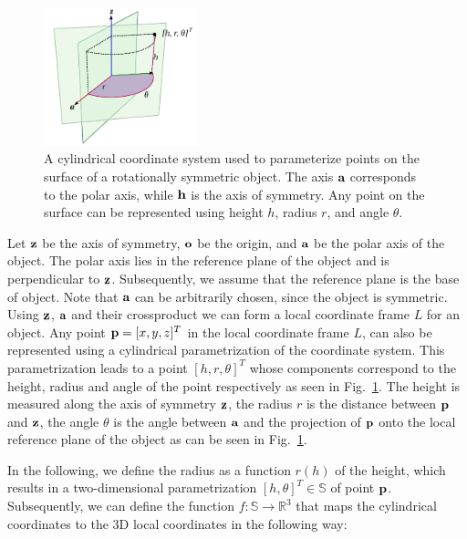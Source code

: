 \documentclass{aamas2015}
\begin{document}
\begin{figure}[h!]
  \begin{center}
    \includegraphics[width=0.4\textwidth]{./images/cylindricalCS.pdf} \quad
  \end{center}
  \caption{A cylindrical coordinate system used to parameterize points on the
  surface of a rotationally symmetric object. The axis $\textbf{a}$ corresponds to the polar axis, while $\textbf{h}$ is the axis of symmetry. Any point on the surface can be represented using height $h$, radius $r$, and angle $\theta$. \label{fig:cylindricalcs}}
\end{figure}
 
Let $\textbf{z}$ be the axis of symmetry, $\textbf{o}$ be the origin, and $\textbf{a}$ be the polar axis of the object. The polar axis lies in the reference plane of the object and is perpendicular to $\textbf{z}$. Subsequently, we assume that the reference plane is the base of object. Note that $\textbf{a}$ can be arbitrarily chosen, since the object is symmetric. Using $\textbf{z}$, $\textbf{a}$ and their crossproduct we can form a local coordinate frame $L$ for an object. Any point $\textbf{p} = [x,y,z]^T$ in the local coordinate frame $L$, can also be represented using a cylindrical parametrization of the coordinate system. This parametrization leads to a point $[h, r, \theta]^T$ whose components correspond to the height, radius and angle of the point respectively as seen in Fig.~\ref{fig:cylindricalcs}. The height is measured along the axis of symmetry $\textbf{z}$, the radius $r$ is the distance between $\textbf{p}$ and $\textbf{z}$, the angle $\theta$ is the angle between $\textbf{a}$ and the projection of $\textbf{p} $ onto the local reference plane of the object as can be seen in Fig.~\ref{fig:cylindricalcs}. 

In the following, we define the radius as a function $r(h)$ of the height, which results in a two-dimensional parametrization $[h, \theta]^T \in \mathbb{S}$ of point $\textbf{p}$. Subsequently, we can define the function $f: \mathbb{S} \rightarrow \mathbb{R}^3$ that maps the cylindrical coordinates to the 3D local coordinates in the following way:
		
\end{document}
